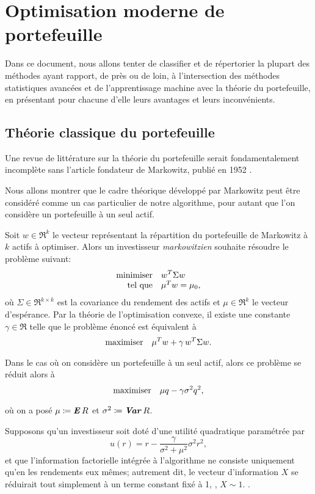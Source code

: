 \section{Optimisation moderne de portefeuille}


Dans ce document, nous allons tenter de classifier et de répertorier la plupart des
méthodes ayant rapport, de près ou de loin, à l'intersection des méthodes statistiques
avancées et de l'apprentissage machine avec la théorie du portefeuille, en présentant pour
chacune d'elle leurs avantages et leurs inconvénients.

\subsection{Théorie classique du portefeuille}

Une revue de littérature sur la théorie du portefeuille serait fondamentalement incomplète
sans l'article fondateur de Markowitz, publié en 1952 \cite{markowitz1952portfolio}.

Nous allons montrer que le cadre théorique développé par Markowitz peut être considéré
comme un cas particulier de notre algorithme, pour autant que l'on considère un portefeuille
à un seul actif.

Soit $w \in \Re^k$ le vecteur représentant la répartition du portefeuille de Markowitz à
$k$ actifs à optimiser. Alors un investisseur \textit{markowitzien} souhaite résoudre le
problème suivant:
\begin{equation}
  \minimizeEquationSt{w^T\Sigma w}[\mu^Tw = \mu_0,]
\end{equation}
où $\Sigma \in \Re^{k \times k}$ est la covariance du rendement des actifs et $\mu \in \Re^k$ le vecteur
d'espérance.   Par la théorie de l'optimisation convexe, il
existe une constante $\gamma\in\Re$ telle que le problème énoncé est équivalent à
\begin{equation}
  \displaystyle{\begin{array}{ll} \displaystyle{\operatorname*{\mbox{maximiser}}_{}} & \displaystyle{\mu^Tw + \gamma\,w^T\Sigma w.} \end{array}}
\end{equation}
Dans le cas où on considère un portefeuille à un seul actif, alors ce problème se réduit
alors à
\begin{equation}
  \label{markov}
  \displaystyle{\begin{array}{ll} \displaystyle{\operatorname*{\mbox{maximiser}}_{}} & \displaystyle{\mu q - \gamma\sigma^2 q^2,} \end{array}}
\end{equation}
où on a posé $\mu \coloneqq \operatorname{\mbox{\textbf{\textit{E}}}} R$ et $\sigma^2 \coloneqq \operatorname{\mbox{\textbf{\textit{Var}}}} R$.

Supposons qu'un investisseur soit doté d'une utilité quadratique paramétrée par
\begin{equation}
  \label{quadu}
  u(r) = r - \frac{\gamma}{\sigma^2+\mu^2}\sigma^2r^2,
\end{equation}
et que l'information factorielle intégrée à l'algorithme ne consiste uniquement qu'en les
rendements eux mêmes; autrement dit, le vecteur d'information $X$ se réduirait tout
simplement à un terme constant fixé à 1, \ie, $X\sim 1$. . 

